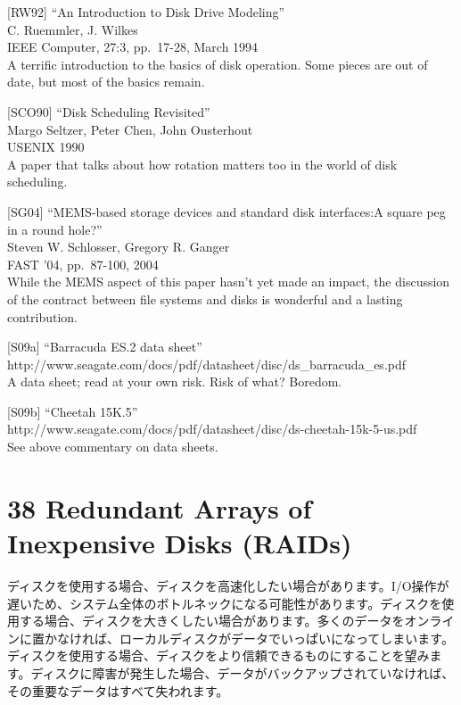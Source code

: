 {[}RW92{]} ``An Introduction to Disk Drive Modeling''\\
C. Ruemmler, J. Wilkes\\
IEEE Computer, 27:3, pp.~17-28, March 1994\\
A terrific introduction to the basics of disk operation. Some pieces are
out of date, but most of the basics remain.

{[}SCO90{]} ``Disk Scheduling Revisited''\\
Margo Seltzer, Peter Chen, John Ousterhout\\
USENIX 1990\\
A paper that talks about how rotation matters too in the world of disk
scheduling.

{[}SG04{]} ``MEMS-based storage devices and standard disk interfaces:A
square peg in a round hole?''\\
Steven W. Schlosser, Gregory R. Ganger\\
FAST '04, pp.~87-100, 2004\\
While the MEMS aspect of this paper hasn't yet made an impact, the
discussion of the contract between file systems and disks is wonderful
and a lasting contribution.

{[}S09a{]} ``Barracuda ES.2 data sheet''\\
http://www.seagate.com/docs/pdf/datasheet/disc/ds\_barracuda\_es.pdf\\
A data sheet; read at your own risk. Risk of what? Boredom.

{[}S09b{]} ``Cheetah 15K.5''\\
http://www.seagate.com/docs/pdf/datasheet/disc/ds-cheetah-15k-5-us.pdf\\
See above commentary on data sheets.

\newpage

\hypertarget{redundant-arrays-of-inexpensive-disks-raids}{%
\section*{38 Redundant Arrays of Inexpensive Disks
(RAIDs)}\label{redundant-arrays-of-inexpensive-disks-raids}}

ディスクを使用する場合、ディスクを高速化したい場合があります。I/O操作が遅いため、システム全体のボトルネックになる可能性があります。ディスクを使用する場合、ディスクを大きくしたい場合があります。多くのデータをオンラインに置かなければ、ローカルディスクがデータでいっぱいになってしまいます。ディスクを使用する場合、ディスクをより信頼できるものにすることを望みます。ディスクに障害が発生した場合、データがバックアップされていなければ、その重要なデータはすべて失われます。

